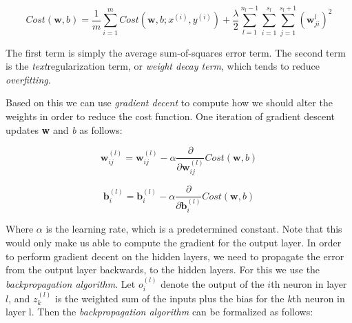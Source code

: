 \begin{equation*}
	Cost(\mathbf{w},b) = \frac{1}{m}\sum_{i=1}^{m}Cost(\mathbf{w},b;x^{(i)},y^{(i)}) + \frac{\lambda}{2}
	\sum_{l=1}^{n_l-1}\sum_{i=1}^{s_l}\sum_{j=1}^{s_l+1}
	(\mathbf{w}_{ji}^{l})^2
\end{equation*}
 
The first term is simply the average sum-of-squares error term. The second term is the \textit{text}regularization term, or \textit{weight decay term}, which tends to reduce \textit{overfitting}.

Based on this we can use \textit{gradient decent} to compute how we should alter the weights in order to reduce the cost function. One iteration of gradient descent updates \textbf{w} and \textit{b} as follows:

\begin{equation*}
	\mathbf{w}_{ij}^{(l)} = \mathbf{w}_{ij}^{(l)} - \alpha\frac{\partial}{\partial\mathbf{w}_{ij}^{(l)} }Cost(\mathbf{w},b)
\end{equation*}

\begin{equation*}
	\mathbf{b}_{i}^{(l)} = \mathbf{b}_{i}^{(l)} - \alpha\frac{\partial}{\partial\mathbf{b}_{i}^{(l)} }Cost(\mathbf{w},b)
\end{equation*}

Where $ \alpha $ is the learning rate, which is a predetermined constant. Note that this would only make us able to compute the gradient for the output layer. In order to perform gradient decent on the hidden layers, we need to propagate the error from the output layer backwards, to the hidden layers. For this we use the \textit{backpropagation algorithm}. Let $ o_i^{(l)} $ denote the output of the $i$th neuron in layer $l$, and $z_k^{(l)}$ is the weighted sum of the inputs plus the bias for the $k$th neuron in layer l. Then the \textit{backpropagation algorithm} can be formalized as follows: 

